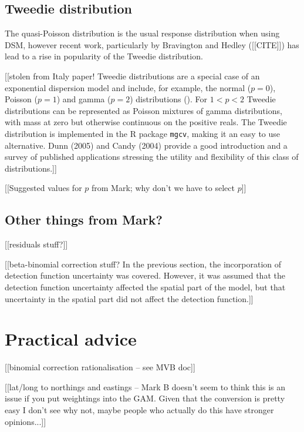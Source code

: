 \documentclass[useAMS,referee]{biom}
\begin{document}
\subsection{Tweedie distribution}
\label{s:Tweedie}

The quasi-Poisson distribution is the usual response distribution when using DSM, however recent work, particularly by Bravington and Hedley ([[CITE]]) has lead to a rise in popularity of the Tweedie distribution. 


[[stolen from Italy paper! 
Tweedie distributions are a special case of an exponential dispersion model and include, for example, the normal ($p=0$), Poisson ($p=1$) and gamma ($p=2$) distributions (\cite{Jorgensen}). For $1<p<2$ Tweedie distributions can be represented as Poisson mixtures of gamma distributions, with mass at zero but otherwise continuous on the positive reals. The Tweedie distribution is implemented in the \textsf{R} package \texttt{mgcv}, making it an easy to use alternative. Dunn (2005) and Candy (2004) provide a good introduction and a survey of published applications stressing the utility and flexibility of this class of distributions.]]


[[Suggested values for $p$ from Mark; why don't we have to select $p$]]

\subsection{Other things from Mark?}

[[residuals stuff?]]

[[beta-binomial correction stuff?
In the previous section, the incorporation of detection function uncertainty was covered. However, it was assumed that the detection function uncertainty affected the spatial part of the model, but that uncertainty in the spatial part did not affect the detection function.]]


\section{Practical advice}
\label{s:practical}

[[binomial correction rationalisation -- see MVB doc]]

[[lat/long to northings and eastings -- Mark B doesn't seem to think this is an issue if you put weightings into the GAM. Given that the conversion is pretty easy I don't see why not, maybe people who actually do this have stronger opinions...]]
\end{document}
